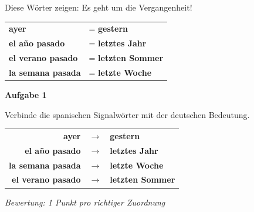 \documentclass[11pt, a4paper]{article}
\newcommand{\fachfarbe}{spanisch}
\newcommand{\punktebox}[1]{\hfill\fbox{\small \_/#1}}
\newcommand{\loesung}[1]{\textcolor{loesung}{\textbf{#1}}}
\newenvironment{aufgabe}[1]{%
    \needspace{5\baselineskip}%
    \nopagebreak[4]%
    \vspace{10pt}
    \noindent\textbf{\textcolor{\fachfarbe}{Aufgabe #1}}
    \nopagebreak[4]%
    \vspace{5pt}
    \nopagebreak[4]%
    \begin{list}{}{\leftmargin=0pt}
    \item[]
}{%
    \end{list}
}
\newcommand{\es}[1]{\textcolor{\fachfarbe}{\textbf{#1}}}
\begin{document}

\begin{merkkasten}
Diese Wörter zeigen: Es geht um die Vergangenheit!

\vspace{0.5em}

\begin{tabular}{ll}
\es{ayer} & = \loesung{gestern} \\[0.8em]
\es{el año pasado} & = \loesung{letztes Jahr} \\[0.8em]
\es{el verano pasado} & = \loesung{letzten Sommer} \\[0.8em]
\es{la semana pasada} & = \loesung{letzte Woche} \\
\end{tabular}
\end{merkkasten}

\vspace{15pt}


\begin{aufgabe}{1}
Verbinde die spanischen Signalwörter mit der deutschen Bedeutung. \punktebox{4}
\end{aufgabe}

\begin{center}
\begin{tabular}{rcl}
\es{ayer} & \loesung{$\rightarrow$} & \loesung{gestern} \\[0.8em]
\es{el año pasado} & \loesung{$\rightarrow$} & \loesung{letztes Jahr} \\[0.8em]
\es{la semana pasada} & \loesung{$\rightarrow$} & \loesung{letzte Woche} \\[0.8em]
\es{el verano pasado} & \loesung{$\rightarrow$} & \loesung{letzten Sommer} \\
\end{tabular}
\end{center}

\textit{\textcolor{grau}{Bewertung: 1 Punkt pro richtiger Zuordnung}}

\vspace{15pt}

\end{document}
